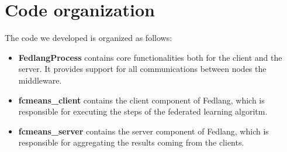 \chapter{Code organization}
The code we developed is organized as follows:
\begin{itemize}
\item \textbf{FedlangProcess} contains core functionalities both for the client and the server. It provides support for all communications 
between nodes the middleware.
\item \textbf{fcmeans\_client} contains the client component of Fedlang, which is responsible for executing the steps of the federated learning algoritm.
\item \textbf{fcmeans\_server} contains the server component of Fedlang, which is responsible for aggregating the results coming from the clients.
\end{itemize}


